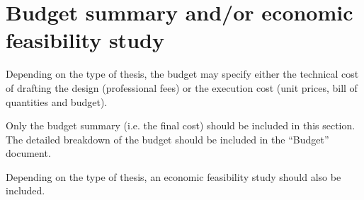 \chapter{Budget summary and/or economic feasibility study}

Depending on the type of thesis, the budget may specify either the technical cost of drafting the design (professional fees) or the execution cost (unit prices, bill of quantities and budget).

Only the budget summary (i.e. the final cost) should be included in this section. The detailed breakdown of the budget should be included in the “Budget” document.

Depending on the type of thesis, an economic feasibility study should also be included.

